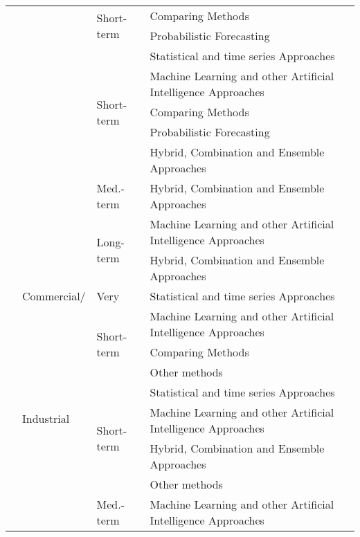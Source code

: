 \begin{table}[]
\begin{tabular}{p{.06\linewidth}p{.08\linewidth}p{.08\linewidth}p{.46\linewidth}p{.29\linewidth}}
		&  & \multirow[t]{2}{*}{Short-term} & Comparing Methods & \cite{mirowski2014dfi} \\
		&  &  & Probabilistic Forecasting & \cite{Wang2019cpl, Yang2019del} \\
		&  & \multirow[t]{5}{*}{Short-term} & Statistical and time series Approaches & \cite{aprillia2019oda, Bhattacharyya2020sgd} \\
		&  &  & Machine Learning and other Artificial   Intelligence Approaches & \cite{moon2019aca, pati2020mfc, khan2020tee} \\
		&  &  & Comparing Methods & \cite{mirowski2014dfi} \\ 
		&  &  & Probabilistic Forecasting & \cite{Taieb2020hpf, chaouch2015rcq, Yang2019del, taieb2016fui} \\
		&  &  & Hybrid, Combination and Ensemble   Approaches & \cite{Amato2021fhr, taieb2016fui} \\
		&  & Med.-term & Hybrid, Combination and Ensemble Approaches & \cite{massidda2019smf} \\
		&  & \multirow[t]{2}{*}{Long-term} & Machine Learning and other Artificial Intelligence Approaches & \cite{fiot2018edf} \\
		&  &  & Hybrid, Combination and Ensemble   Approaches & \cite{massidda2019smf} \\
		\cmidrule(lr){2-5}
		& \multirow[t]{1}{*}{{Commercial/}} & \multirow[t]{1}{*}{Very} & Statistical and time series Approaches & \cite{ullah2018apm} \\
		& \multirow[t]{9}{*}{{Industrial}} & \multirow[t]{3}{*}{Short-term} & Machine Learning and other Artificial   Intelligence Approaches & \cite{Feng2020rda} \\
		&  &  & Comparing Methods & \cite{grolinger2016eff} \\
		&  &  & Other methods & \cite{xu2020ats} \\
		&  & \multirow[t]{4}{*}{Short-term} & Statistical and time series Approaches & \cite{Ding2015nms, ullah2018apm, Lee2013asm} \\
		&  &  & Machine Learning and other Artificial   Intelligence Approaches & \cite{ribeiro2018tls, petrosanu2019ddv, Jurado2015hme, jurado2017fir} \\
		&  &  & Hybrid, Combination and Ensemble   Approaches & \cite{ruiz-abellon2018lff, Jung2020bem} \\
		&  &  & Other methods & \cite{xu2020ats} \\
		&  & Med.-term & Machine Learning and other Artificial Intelligence Approaches & \cite{gao2020dla} \\

\end{tabular}
\end{table}

